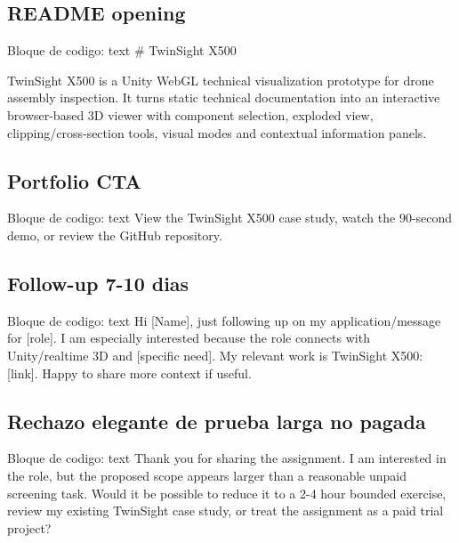 \subsection{README opening}


\begin{mdcode}
Bloque de codigo: text
# TwinSight X500

TwinSight X500 is a Unity WebGL technical visualization prototype for drone assembly inspection. It turns static technical documentation into an interactive browser-based 3D viewer with component selection, exploded view, clipping/cross-section tools, visual modes and contextual information panels.
\end{mdcode}


\subsection{Portfolio CTA}


\begin{mdcode}
Bloque de codigo: text
View the TwinSight X500 case study, watch the 90-second demo, or review the GitHub repository.
\end{mdcode}


\subsection{Follow-up 7-10 dias}


\begin{mdcode}
Bloque de codigo: text
Hi [Name], just following up on my application/message for [role]. I am especially interested because the role connects with Unity/realtime 3D and [specific need]. My relevant work is TwinSight X500: [link]. Happy to share more context if useful.
\end{mdcode}


\subsection{Rechazo elegante de prueba larga no pagada}


\begin{mdcode}
Bloque de codigo: text
Thank you for sharing the assignment. I am interested in the role, but the proposed scope appears larger than a reasonable unpaid screening task. Would it be possible to reduce it to a 2-4 hour bounded exercise, review my existing TwinSight case study, or treat the assignment as a paid trial project?
\end{mdcode}

